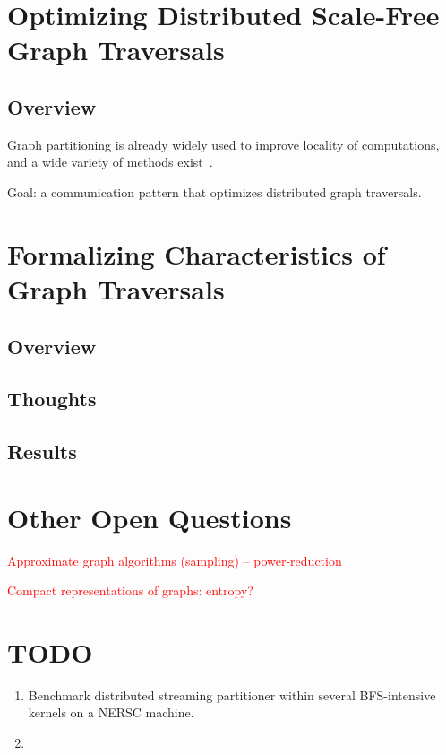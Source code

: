 \documentclass[11pt]{article}
\newcommand\warning[1]{\textcolor{red}{#1}}
\begin{document}


\newpage \section{Optimizing Distributed Scale-Free Graph Traversals}
\subsection{Overview}
Graph partitioning is already widely used to improve locality of computations, and a wide variety of methods exist~\cite{DBLP:journals/corr/BulucMSSS13}. 

Goal: a communication pattern that optimizes distributed graph traversals.



\newpage \section{Formalizing Characteristics of Graph Traversals}
\subsection{Overview}

\subsection{Thoughts}

\subsection{Results}


\newpage \section{Other Open Questions}

\warning{Approximate graph algorithms (sampling) -- power-reduction}

\warning{Compact representations of graphs: entropy?}


\newpage \section{TODO}
\begin{enumerate}
\item Benchmark distributed streaming partitioner within several BFS-intensive kernels on a NERSC machine.
\item
\end{enumerate}




\end{document}
